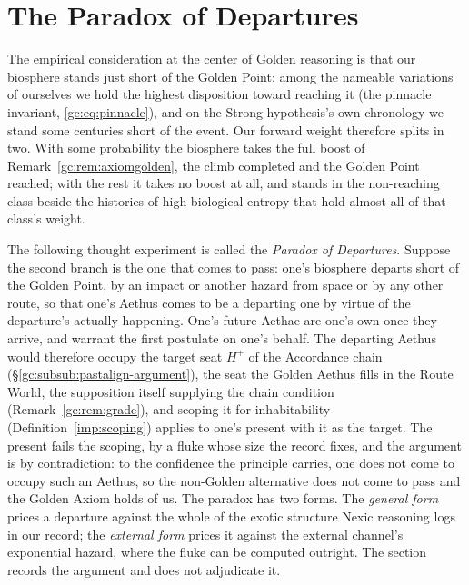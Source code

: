 \section{The Paradox of Departures}\label{sec:departures}\label{gc:sub:departures}

The empirical consideration at the center of Golden reasoning is that our
biosphere stands just short of the Golden Point: among the nameable
variations of ourselves we hold the highest disposition toward reaching
it (the pinnacle invariant, \eqref{gc:eq:pinnacle}), and on the Strong
hypothesis's own chronology we stand some centuries short of the event.
Our forward weight therefore splits in two. With some probability the
biosphere takes the full boost of Remark~\ref{gc:rem:axiomgolden}, the
climb completed and the Golden Point reached; with the rest it takes no
boost at all, and stands in the non-reaching class beside the histories
of high biological entropy that hold almost all of that class's weight.

The following thought experiment is called the \emph{Paradox of
Departures}. Suppose the second branch is the one that comes to pass:
one's biosphere departs short of the Golden Point, by an impact or
another hazard from space or by any other route, so that one's Aethus
comes to be a departing one by virtue of the departure's actually
happening. One's future Aethae are one's own once they arrive, and
warrant the first postulate on one's behalf. The departing Aethus would
therefore occupy the target seat $H^{+}$ of the Accordance chain
(\S\ref{gc:subsub:pastalign-argument}), the seat the Golden Aethus fills
in the Route World, the supposition itself supplying the chain condition
(Remark~\ref{gc:rem:grade}), and scoping it for inhabitability
(Definition~\ref{imp:scoping}) applies to one's present with it as the
target. The present fails the scoping, by a fluke whose size the record
fixes, and the argument is by contradiction: to the confidence the
principle carries, one does not come to occupy such an Aethus, so the
non-Golden alternative does not come to pass and the Golden Axiom holds
of us. The paradox has two forms. The \emph{general form} prices a
departure against the whole of the exotic structure Nexic reasoning logs
in our record; the \emph{external form} prices it against the external
channel's exponential hazard, where the fluke can be computed outright.
The section records the argument and does not adjudicate it.

